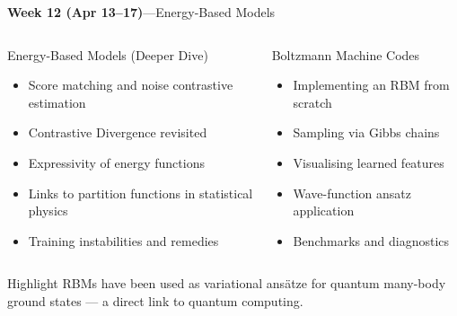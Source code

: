 \documentclass[aspectratio=169,11pt]{beamer}
\begin{document}
\begin{frame}{{\color{mlgold}\textbf{Week 12 (Apr 13--17)}\;---\;Energy-Based Models}}
  \begin{columns}[T]
      \begin{block}{Energy-Based Models (Deeper Dive)}
        \begin{itemize}\itemsep1pt
          \item Score matching and noise contrastive estimation
          \item Contrastive Divergence revisited
          \item Expressivity of energy functions
          \item Links to partition functions in statistical physics
          \item Training instabilities and remedies
        \end{itemize}
      \end{block}
      \begin{block}{Boltzmann Machine Codes}
        \begin{itemize}\itemsep1pt
          \item Implementing an RBM from scratch
          \item Sampling via Gibbs chains
          \item Visualising learned features
          \item Wave-function ansatz application
          \item Benchmarks and diagnostics
        \end{itemize}
      \end{block}
  \end{columns}
  \vspace{3pt}
  \begin{exampleblock}{Highlight}
    RBMs have been used as variational ans\"{a}tze for quantum
    many-body ground states --- a direct link to quantum computing.
  \end{exampleblock}
\end{frame}
\end{document}
